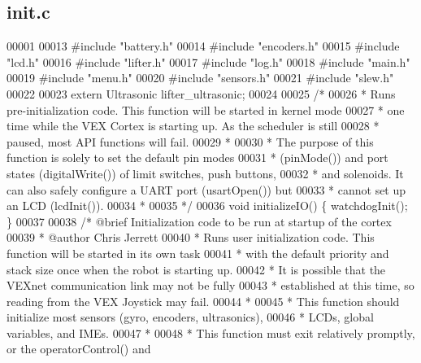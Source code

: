 \subsection{init.\+c}
\label{init_8c_source}

\begin{DoxyCode}
00001 
00013 \textcolor{preprocessor}{#include "battery.h"}
00014 \textcolor{preprocessor}{#include "encoders.h"}
00015 \textcolor{preprocessor}{#include "lcd.h"}
00016 \textcolor{preprocessor}{#include "lifter.h"}
00017 \textcolor{preprocessor}{#include "log.h"}
00018 \textcolor{preprocessor}{#include "main.h"}
00019 \textcolor{preprocessor}{#include "menu.h"}
00020 \textcolor{preprocessor}{#include "sensors.h"}
00021 \textcolor{preprocessor}{#include "slew.h"}
00022 
00023 \textcolor{keyword}{extern} Ultrasonic lifter_ultrasonic;
00024 
00025 \textcolor{comment}{/*}
00026 \textcolor{comment}{ * Runs pre-initialization code. This function will be started in kernel mode}
00027 \textcolor{comment}{ * one time while the VEX Cortex is starting up. As the scheduler is still}
00028 \textcolor{comment}{ * paused, most API functions will fail.}
00029 \textcolor{comment}{ *}
00030 \textcolor{comment}{ * The purpose of this function is solely to set the default pin modes}
00031 \textcolor{comment}{ * (pinMode()) and port states (digitalWrite()) of limit switches, push buttons,}
00032 \textcolor{comment}{ * and solenoids. It can also safely configure a UART port (usartOpen()) but}
00033 \textcolor{comment}{ * cannot set up an LCD (lcdInit()).}
00034 \textcolor{comment}{ *}
00035 \textcolor{comment}{ */}
00036 \textcolor{keywordtype}{void} initializeIO() \{ watchdogInit(); \}
00037 
00038 \textcolor{comment}{/* @brief Initialization code to be run at startup of the cortex}
00039 \textcolor{comment}{ * @author Chris Jerrett}
00040 \textcolor{comment}{ * Runs user initialization code. This function will be started in its own task}
00041 \textcolor{comment}{ * with the default priority and stack size once when the robot is starting up.}
00042 \textcolor{comment}{ * It is possible that the VEXnet communication link may not be fully}
00043 \textcolor{comment}{ * established at this time, so reading from the VEX Joystick may fail.}
00044 \textcolor{comment}{ *}
00045 \textcolor{comment}{ * This function should initialize most sensors (gyro, encoders, ultrasonics),}
00046 \textcolor{comment}{ * LCDs, global variables, and IMEs.}
00047 \textcolor{comment}{ *}
00048 \textcolor{comment}{ * This function must exit relatively promptly, or the operatorControl() and}

\end{DoxyCode}
